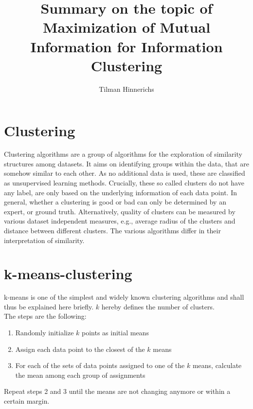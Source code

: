 \documentclass[]{article}
\title{Summary on the topic of Maximization of Mutual Information for Information Clustering}
\author{Tilman Hinnerichs}
\begin{document}
\maketitle
\section{Clustering}
Clustering algorithms are a group of algorithms for the exploration of similarity structures among datasets. It aims on identifying groups within the data, that are somehow similar to each other. As no additional data is used, these are classified as unsupervised learning methods. Crucially, these so called clusters do not have any label, are only based on the underlying information of each data point. In general, whether a clustering is good or bad can only be determined by an expert, or ground truth. Alternatively, quality of clusters can be measured by various dataset independent measures, e.g., average radius of the clusters and distance between different clusters. The various algorithms differ in their interpretation of similarity. \\
\section{k-means-clustering}
k-means is one of the simplest and widely known clustering algorithms and shall thus be explained here briefly. $k$ hereby defines the number of clusters.\\
The steps are the following:
\begin{enumerate}
	\item Randomly initialize $k$ points as initial means 
	\item Assign each data point to the closest of the $k$ means
	\item For each of the sets of data points assigned to one of the $k$ means, calculate the mean among each group of assignments
\end{enumerate}
Repeat steps 2 and 3 until the means are not changing anymore or within a certain margin.
\end{document}
